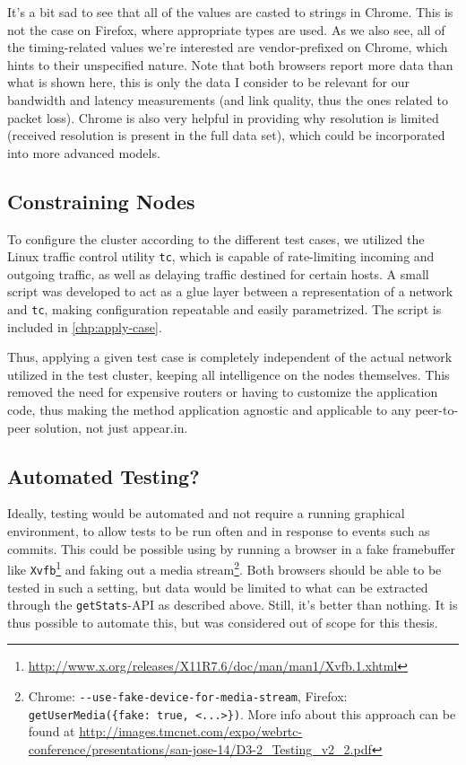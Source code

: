 It's a bit sad to see that all of the values are casted to strings in Chrome. This is not the case on Firefox, where appropriate types are used. As we also see, all of the timing-related values we're interested are vendor-prefixed on Chrome, which hints to their unspecified nature. Note that both browsers report more data than what is shown here, this is only the data I consider to be relevant for our bandwidth and latency measurements (and link quality, thus the ones related to packet loss). Chrome is also very helpful in providing why resolution is limited (received resolution is present in the full data set), which could be incorporated into more advanced models.


\subsection{Constraining Nodes}

To configure the cluster according to the different test cases, we utilized the Linux traffic control utility \texttt{tc}, which is capable of rate-limiting incoming and outgoing traffic, as well as delaying traffic destined for certain hosts. A small script was developed to act as a glue layer between a representation of a network and \texttt{tc}, making configuration repeatable and easily parametrized. The script is included in \autoref{chp:apply-case}.

Thus, applying a given test case is completely independent of the actual network utilized in the test cluster, keeping all intelligence on the nodes themselves. This removed the need for expensive routers or having to customize the application code, thus making the method application agnostic and applicable to any peer-to-peer solution, not just appear.in.


\subsection{Automated Testing?}

Ideally, testing would be automated and not require a running graphical environment, to allow tests to be run often and in response to events such as commits. This could be possible using by running a browser in a fake framebuffer like \texttt{Xvfb}\footnote{\url{http://www.x.org/releases/X11R7.6/doc/man/man1/Xvfb.1.xhtml}} and faking out a media stream\footnote{Chrome: \texttt{-{}-use-fake-device-for-media-stream}, Firefox: \texttt{getUserMedia(\{fake: true, <...>\})}. More info about this approach can be found at \url{http://images.tmcnet.com/expo/webrtc-conference/presentations/san-jose-14/D3-2_Testing_v2_2.pdf}}. Both browsers should be able to be tested in such a setting, but data would be limited to what can be extracted through the \texttt{getStats}-API as described above. Still, it's better than nothing. It is thus possible to automate this, but was considered out of scope for this thesis.


